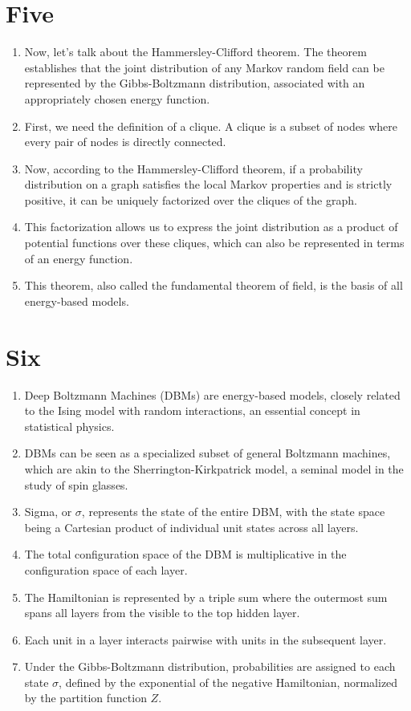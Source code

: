 \documentclass{article}
\begin{document}
\section*{Five}
\begin{enumerate}
    \item Now, let's talk about the Hammersley-Clifford theorem. The theorem establishes that the joint distribution of any Markov random field can be represented by the Gibbs-Boltzmann distribution, associated with an appropriately chosen energy function.
    \item First, we need the definition of a clique. A clique is a subset of nodes where every pair of nodes is directly connected.
    \item Now, according to the Hammersley-Clifford theorem, if a probability distribution on a graph satisfies the local Markov properties and is strictly positive, it can be uniquely factorized over the cliques of the graph.
    \item This factorization allows us to express the joint distribution as a product of potential functions over these cliques, which can also be represented in terms of an energy function.
    \item This theorem, also called the fundamental theorem of field, is the basis of all energy-based models.
\end{enumerate}

\section*{Six}
\begin{enumerate}
    \item Deep Boltzmann Machines (DBMs) are energy-based models, closely related to the Ising model with random interactions, an essential concept in statistical physics.
    \item DBMs can be seen as a specialized subset of general Boltzmann machines, which are akin to the Sherrington-Kirkpatrick model, a seminal model in the study of spin glasses.
    \item Sigma, or \(\sigma\), represents the state of the entire DBM, with the state space being a Cartesian product of individual unit states across all layers.
    \item The total configuration space of the DBM is multiplicative in the configuration space of each layer.
    \item The Hamiltonian is represented by a triple sum where the outermost sum spans all layers from the visible to the top hidden layer.
    \item Each unit in a layer interacts pairwise with units in the subsequent layer.
    \item Under the Gibbs-Boltzmann distribution, probabilities are assigned to each state \(\sigma\), defined by the exponential of the negative Hamiltonian, normalized by the partition function \(Z\).
\end{enumerate}
\end{document}
